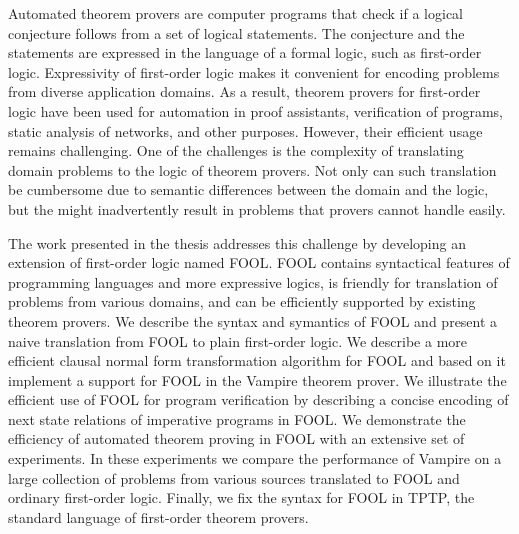 Automated theorem provers are computer programs that check if a logical conjecture follows from a set of logical statements. The conjecture and the statements are expressed in the language of a formal logic, such as first-order logic. Expressivity of first-order logic makes it convenient for encoding problems from diverse application domains. As a result, theorem provers for first-order logic have been used for automation in proof assistants, verification of programs, static analysis of networks, and other purposes. However, their efficient usage remains challenging. One of the challenges is the complexity of translating domain problems to the logic of theorem provers. Not only can such translation be cumbersome due to semantic differences between the domain and the logic, but the might inadvertently result in problems that provers cannot handle easily.

The work presented in the thesis addresses this challenge by developing an extension of first-order logic named FOOL. FOOL contains syntactical features of programming languages and more expressive logics, is friendly for translation of problems from various domains, and can be efficiently supported by existing theorem provers. We describe the syntax and symantics of FOOL and present a naive translation from FOOL to plain first-order logic. We describe a more efficient clausal normal form transformation algorithm for FOOL and based on it implement a support for FOOL in the Vampire theorem prover. We illustrate the efficient use of FOOL for program verification by describing a concise encoding of next state relations of imperative programs in FOOL. We demonstrate the efficiency of automated theorem proving in FOOL with an extensive set of experiments. In these experiments we compare the performance of Vampire on a large collection of problems from various sources translated to FOOL and ordinary first-order logic. Finally, we fix the syntax for FOOL in TPTP, the standard language of first-order theorem provers.